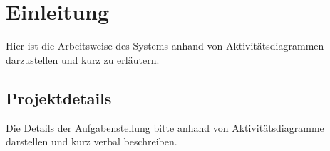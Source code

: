 
\chapter{Einleitung}
Hier ist die Arbeitsweise des Systems anhand von Aktivitätsdiagrammen darzustellen und
kurz zu erläutern.
\section{Projektdetails}
Die Details der Aufgabenstellung bitte anhand von Aktivitätsdiagramme darstellen und
kurz verbal beschreiben.
